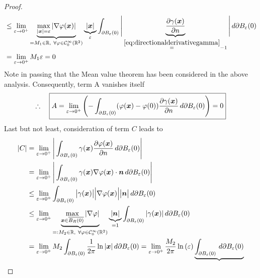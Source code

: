 \documentclass[12pt]{article}
\begin{document}
\begin{proof}
\begin{align}
		    & \leq
		\lim_{\varepsilon\to 0^+}
		\underbrace{\max_{|{\boldsymbol{\mathnormal x}}|=\varepsilon}{|\nabla\varphi({\boldsymbol{\mathnormal x}})|}}
		_{= M_{1}\in\mathbb{R},\ \forall \varphi \in \mathcal{C}^{\infty}_{0}(\mathbb{R}^2)} 
		\underbrace{|{\boldsymbol{\mathnormal x}}|}_{\varepsilon}
		\int_{\partial B_\varepsilon(0)}
		\Bigg|\underbrace{\frac{\partial\gamma({\boldsymbol{\mathnormal x}})}{\partial n}}
		_{\stackrel{\eqref{eq:directionalderivativegamma}}{=} -1}\Bigg|\, d\partial B_\varepsilon(0) \notag \\
		    & = \lim_{\varepsilon\to 0^+} M_{1}\varepsilon = 0
	\end{align}
	Note in passing that the Mean value theorem has been considered in the above analysis. 
	Consequently, term A vanishes itself
	\begin{align}
		\label{eq:TermAfinal}
		\therefore\quad\boxed{
			A = \lim_{\varepsilon\to 0^+}
			\left(
			-
			\int_{\partial B_\varepsilon(0)} (\varphi({\boldsymbol{\mathnormal x}})-\varphi(0))
			\frac{\partial\gamma({\boldsymbol{\mathnormal x}})}{\partial n}\, d\partial B_{\varepsilon}(0) \right) = 0
		}
	\end{align}
	Last but not least, consideration of term $C$ leads to
	\begin{align}
		|C| 
		 & =
		\lim_{\varepsilon\to 0^+}
		\Bigg|
		\int_{\partial B_\varepsilon(0)} \gamma(\Bx)
		\frac{\partial\varphi(\Bx)}{\partial n}\, d\partial B_{\varepsilon}(0)
		\Bigg|                                                                    \notag \\
		 & =
		\lim_{\varepsilon\to 0^+}
		\Bigg|
		\int_{\partial B_\varepsilon(0)} \gamma(\Bx)
		\nabla\varphi(\Bx)\cdot \Bn
		\, d\partial B_{\varepsilon}(0)
		\Bigg|                                                                    \notag \\
		 & \leq
		\lim_{\varepsilon\to 0^+}
		\int_{\partial B_\varepsilon(0)}
		\big| \gamma(\Bx) \big|
		\Big|\nabla\varphi(\Bx)\Big| 
		\big| \Bn \big|
		\, d\partial B_{\varepsilon}(0)                                           \notag \\
		 & \leq
		\lim_{\varepsilon\to 0^+}
		\underbrace{\max_{\Bx\in\overline{B_R(0)}}|\nabla \varphi|}
		_{=:M_{2}\in\mathbb{R},\ \forall \varphi \in \mathcal{C}^{\infty}_{0}(\mathbb{R}^2)} 
		\underbrace{|\Bn|}_{=1}
		\int_{\partial B_\varepsilon(0)}|\gamma(\Bx)|\,d\partial B_\varepsilon(0) \notag \\
		 & = 
		\lim_{\varepsilon\to 0^+}
		M_{2}
		\int_{\partial B_\varepsilon(0)}
		\frac{1}{2\pi} \ln{|\Bx|}
		\,d\partial B_\varepsilon(0)
		= \lim_{\varepsilon\to 0^+}
		\frac{M_{2}}{2\pi} \ln{(\varepsilon)}
		\underbrace{\int_{\partial B_\varepsilon(0)}\,d\partial B_\varepsilon(0)}

\end{align}
\end{proof}
\end{document}
